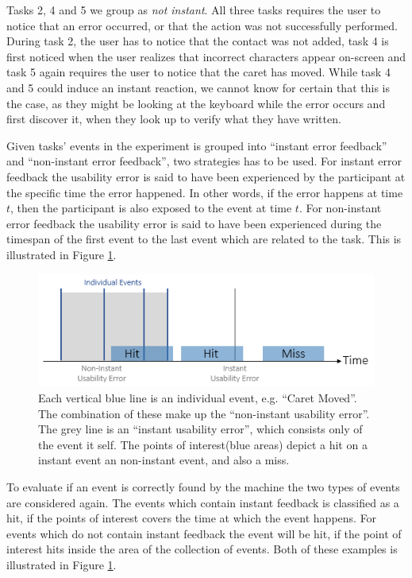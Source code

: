 Tasks 2, 4 and 5 we group as \textit{not instant}. All three tasks requires the user to notice that an error occurred, or
that the action was not successfully performed. During task 2, the user has to notice that the contact was not added,
task 4 is first noticed when the user realizes that incorrect characters appear on-screen and task 5 again requires the
user to notice that the caret has moved. While task 4 and 5 could induce an instant reaction, we cannot know for
certain that this is the case, as they might be looking at the keyboard while the error occurs and first discover it, when they look up to verify what they have written.

Given tasks' events in the experiment is grouped into ``instant error feedback'' and ``non-instant error feedback'', two strategies has to be used. 
For instant error feedback the usability error is said to have been experienced by the participant at the specific time the error happened. In other words, if the error happens at time $t$, then the participant is also exposed to the event at time $t$.
For non-instant error feedback the usability error is said to have been experienced during the timespan of the first event to the last event which are related to the task. This is illustrated in Figure \ref{[FIGURE] non-instant illustration}.
\begin{figure}
    \centering
  \includegraphics[width=0.75\columnwidth]{graphics/hitmiss.png}
    \caption{Each vertical blue line is an individual event, e.g. ``Caret Moved''. The combination of these make up the ``non-instant usability error''. The grey line is an ``instant usability error'', which consists only of the event it self. The points of interest(blue areas) depict a hit on a instant event an non-instant event, and also a miss.}
    \label{[FIGURE] non-instant illustration}
\end{figure}
To evaluate if an event is correctly found by the machine the two types of events are considered again.
The events which contain instant feedback is classified as a hit, if the points of interest covers the time at which the event happens.
For events which do not contain instant feedback the event will be hit, if the point of interest hits inside the area of the collection of events. Both of these examples is illustrated in Figure \ref{[FIGURE] non-instant illustration}.


